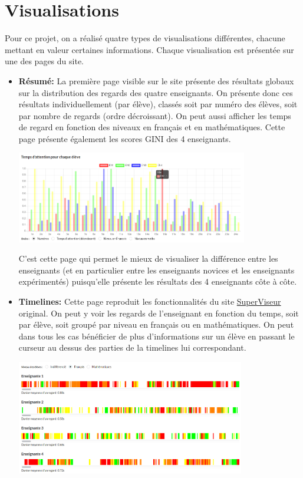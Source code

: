 \documentclass{article}
\begin{document}
\section{Visualisations}
Pour ce projet, on a réalisé quatre types de visualisations différentes, chacune mettant en valeur certaines informations. Chaque visualisation est présentée sur une des pages du site.
\begin{itemize}
    \item \textbf{Résumé:} La première page visible sur le site présente des résultats globaux sur la distribution des regards des quatre enseignants. On présente donc ces résultats individuellement (par élève), classés soit par numéro des élèves, soit par nombre de regards (ordre décroissant). On peut aussi afficher les temps de regard en fonction des niveaux en français et en mathématiques. Cette page présente également les scores GINI des 4 enseignants. 
        \begin{center}
            \includegraphics[height=4cm]{resume.png}
        \end{center}
        C'est cette page qui permet le mieux de visualiser la différence entre les enseignants (et en particulier entre les enseignants novices et les enseignants expérimentés) puisqu'elle présente les résultats des 4 enseignants côte à côte.\\
    \item \textbf{Timelines:} Cette page reproduit les fonctionnalités du site \href{http://superviseur.lip6.fr/}{SuperViseur} original. On peut y voir les regards de l'enseignant en fonction du temps, soit par élève, soit groupé par niveau en français ou en mathématiques. On peut dans tous les cas bénéficier de plus d'informations sur un élève en passant le curseur au dessus des parties de la timelines lui correspondant. 
        \begin{center}
            \includegraphics[height=5cm]{timelines.png}

\end{center}
\end{itemize}
\end{document}

